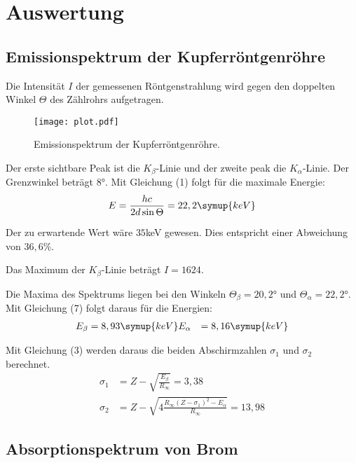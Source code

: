 \section{Auswertung}
\label{sec:Auswertung}

\subsection{Emissionspektrum der Kupferröntgenröhre}

Die Intensität $I$ der gemessenen Röntgenstrahlung wird gegen den doppelten Winkel $\Theta$ des Zählrohrs aufgetragen.

\begin{figure}[H]
  \centering
  \texttt{[image: plot.pdf]}
  \caption{Emissionspektrum der Kupferröntgenröhre.}
  \label{fig:plot}
\end{figure}

Der erste sichtbare Peak ist die $K_{\beta}$-Linie und der zweite peak die $K_{\alpha}$-Linie.
Der Grenzwinkel beträgt $8$°.
Mit Gleichung (1) folgt für die maximale Energie:
\begin{equation}
  E = \frac{hc}{2d \sin{\Theta}} = 22,2 \symup{keV}
\end{equation}

Der zu erwartende Wert wäre $35$keV gewesen.
Dies entspricht einer Abweichung von $36,6 \%$.

Das Maximum der $K_{\beta}$-Linie beträgt $I=1624$.



Die Maxima des Spektrums liegen bei den Winkeln $\Theta_{\beta} = 20,2°$ und $\Theta_{\alpha} = 22,2°$.
Mit Gleichung (7) folgt daraus für die Energien:
\begin{align*}
  E_{\beta} &= 8,93 \symup{keV}
  E_{\alpha} &= 8,16 \symup{keV}
\end{align*}

Mit Gleichung (3) werden daraus die beiden Abschirmzahlen $\sigma_1$ und $\sigma_2$ berechnet.
\begin{align*}
  \sigma_1 &= Z - \sqrt{\frac{E_{\beta}}{R_{\infty}}} = 3,38 \\
  \sigma_2 &= Z - \sqrt{4 \frac{R_{\infty} (Z-\sigma_1)^2 - E_{\alpha}}{R_{\infty}}} = 13,98
\end{align*}


\subsection{Absorptionspektrum von Brom}

